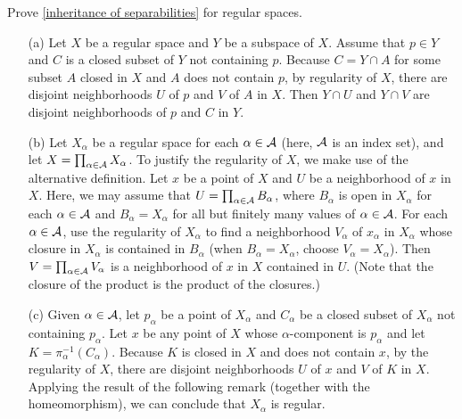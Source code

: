 \begin{prob}\label{inheritance: regular}
    Prove \cref{inheritance of separabilities} for regular spaces.
\end{prob}
\begin{sol}
    \begin{enumerate}
        \item[(a)]
        {
            Let $X$ be a regular space and $Y$ be a subspace of $X$.
            Assume that $p\in Y$ and $C$ is a closed subset of $Y$ not containing $p$.
            Because $C=Y\cap A$ for some subset $A$ closed in $X$ and $A$ does not contain $p$, by regularity of $X$, there are disjoint neighborhoods $U$ of $p$ and $V$ of $A$ in $X$.
            Then $Y\cap U$ and $Y\cap V$ are disjoint neighborhoods of $p$ and $C$ in $Y$.
        }
        \item[(b)]
        {
            Let $X_\alpha$ be a regular space for each $\alpha\in{\mathcal{A}}$ (here, ${\mathcal{A}}$ is an index set), and let $X=\prod_{\alpha\in{\mathcal{A}}} X_\alpha$.
            To justify the regularity of $X$, we make use of the alternative definition.
            Let $x$ be a point of $X$ and $U$ be a neighborhood of $x$ in $X$.
            Here, we may assume that $U=\prod_{\alpha\in{\mathcal{A}}} B_\alpha$, where $B_\alpha$ is open in $X_\alpha$ for each $\alpha\in{\mathcal{A}}$ and $B_\alpha=X_\alpha$ for all but finitely many values of $\alpha\in{\mathcal{A}}$.
            For each $\alpha\in{\mathcal{A}}$, use the regularity of $X_\alpha$ to find a neighborhood $V_\alpha$ of $x_\alpha$ in $X_\alpha$ whose closure in $X_\alpha$ is contained in $B_\alpha$ (when $B_\alpha=X_\alpha$, choose $V_\alpha=X_\alpha$).
            Then $V=\prod_{\alpha\in{\mathcal{A}}} V_\alpha$ is a neighborhood of $x$ in $X$ contained in $U$.
            (Note that the closure of the product is the product of the closures.)
        }
        \item[(c)]
        {
            Given $\alpha\in{\mathcal{A}}$, let $p_\alpha$ be a point of $X_\alpha$ and $C_\alpha$ be a closed subset of $X_\alpha$ not containing $p_\alpha$.
            Let $x$ be any point of $X$ whose $\alpha$-component is $p_\alpha$ and let $K=\pi_\alpha^{-1} (C_\alpha)$.
            Because $K$ is closed in $X$ and does not contain $x$, by the regularity of $X$, there are disjoint neighborhoods $U$ of $x$ and $V$ of $K$ in $X$.
            Applying the result of the following remark (together with the homeomorphism), we can conclude that $X_\alpha$ is regular.
        }
    \end{enumerate}
\end{sol}
